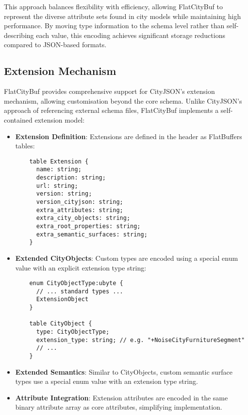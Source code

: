 This approach balances flexibility with efficiency, allowing FlatCityBuf to represent the diverse attribute sets found in city models while maintaining high performance. By moving type information to the schema level rather than self-describing each value, this encoding achieves significant storage reductions compared to JSON-based formats.

\subsection{Extension Mechanism}
\label{methodology:feature_encoding:extension_mechanism}

FlatCityBuf provides comprehensive support for CityJSON's extension mechanism, allowing customisation beyond the core schema. Unlike CityJSON's approach of referencing external schema files, FlatCityBuf implements a self-contained extension model:

\begin{itemize}
    \item \textbf{Extension Definition}: Extensions are defined in the header as FlatBuffers tables:

    \begin{verbatim}
    table Extension {
      name: string;
      description: string;
      url: string;
      version: string;
      version_cityjson: string;
      extra_attributes: string;
      extra_city_objects: string;
      extra_root_properties: string;
      extra_semantic_surfaces: string;
    }
    \end{verbatim}

    \item \textbf{Extended CityObjects}: Custom types are encoded using a special enum value with an explicit extension type string:

    \begin{verbatim}
    enum CityObjectType:ubyte {
      // ... standard types ...
      ExtensionObject
    }

    table CityObject {
      type: CityObjectType;
      extension_type: string; // e.g. "+NoiseCityFurnitureSegment"
      // ...
    }
    \end{verbatim}

    \item \textbf{Extended Semantics}: Similar to CityObjects, custom semantic surface types use a special enum value with an extension type string.

    \item \textbf{Attribute Integration}: Extension attributes are encoded in the same binary attribute array as core attributes, simplifying implementation.
\end{itemize}

